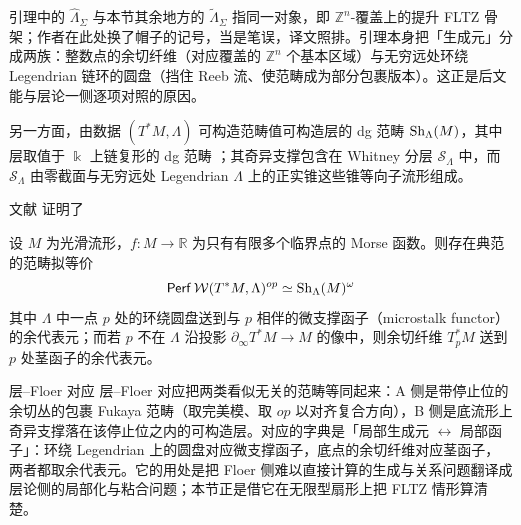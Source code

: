 \begin{yizhu}
    引理中的 $\widehat{\Lambda}_{\Sigma}$ 与本节其余地方的 $\widetilde{\Lambda}_{\Sigma}$ 指同一对象，即 $\mathbb{Z}^n$-覆盖上的提升 FLTZ 骨架；作者在此处换了帽子的记号，当是笔误，译文照排。引理本身把「生成元」分成两族：整数点的余切纤维（对应覆盖的 $\mathbb{Z}^n$ 个基本区域）与无穷远处环绕 Legendrian 链环的圆盘（挡住 Reeb 流、使范畴成为部分包裹版本）。这正是后文能与层论一侧逐项对照的原因。
\end{yizhu}

    另一方面，由数据 $(T^{\ast}M,\Lambda)$ 可构造范畴值可构造层的 dg 范畴 $\operatorname{Sh}_{\Lambda} (M)$，其中层取值于 $\Bbbk$ 上链复形的 dg 范畴 \cite{GPS24M}；其奇异支撑包含在 Whitney 分层 $\mathcal{S}_{\Lambda}$ 中，而 $\mathcal{S}_{\Lambda}$ 由零截面与无穷远处 Legendrian $\Lambda$ 上的正实锥这些锥等向子流形组成。\par
    文献 \cite{GPS24M} 证明了
\begin{thm}[层--Floer 对应]\label{thm:sheaf-Floer-correspondence}
    设 $M$ 为光滑流形，$f\colon M\to\mathbb{R}$ 为只有有限多个临界点的 Morse 函数。则存在典范的范畴拟等价
\[
        \operatorname{\mathsf{Perf}}\mathcal{W} (T^{\ast} M,\Lambda)^{op}\simeq\operatorname{Sh}_{\Lambda} (M)^{\omega}
\]
其中 $\Lambda$ 中一点 $p$ 处的环绕圆盘送到与 $p$ 相伴的微支撑函子（microstalk functor）的余代表元；而若 $p$ 不在 $\Lambda$ 沿投影 $\partial_{\infty} T^{\ast} M\to M$ 的像中，则余切纤维 $T^{\ast}_p M$ 送到 $p$ 处茎函子的余代表元。
\end{thm}

\begin{conceptbox}{层--Floer 对应}
    层--Floer 对应把两类看似无关的范畴等同起来：A 侧是带停止位的余切丛的包裹 Fukaya 范畴（取完美模、取 $op$ 以对齐复合方向），B 侧是底流形上奇异支撑落在该停止位之内的可构造层。对应的字典是「局部生成元 $\leftrightarrow$ 局部函子」：环绕 Legendrian 上的圆盘对应微支撑函子，底点的余切纤维对应茎函子，两者都取余代表元。它的用处是把 Floer 侧难以直接计算的生成与关系问题翻译成层论侧的局部化与粘合问题；本节正是借它在无限型扇形上把 FLTZ 情形算清楚。
\par\smallskip{}
\end{conceptbox}

